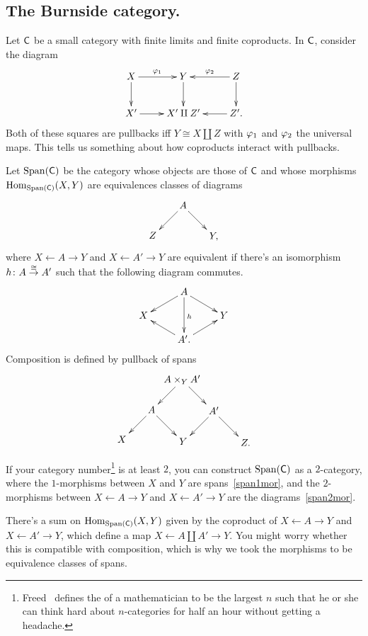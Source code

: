 \subsection*{The Burnside category.}
Let $\mathsf C$ be a small category with finite limits and finite coproducts. In $\mathsf C$, consider the diagram
\[\xymatrix{
	X\ar[r]^{\vp_1}\ar[d] & Y\ar[d] & Z\ar[d]\ar[l]_{\vp_2}\\
	X'\ar[r] & X'\amalg Z' & Z'.\ar[l]
}\]
Both of these squares are pullbacks iff $Y\cong X\amalg Z$ with $\varphi_1$ and $\varphi_2$ the universal maps. This tells
us something about how coproducts interact with pullbacks.
\begin{defn}
Let $\operatorname{Span}(\mathsf C)$ be the category whose objects are those of $\mathsf C$ and whose morphisms $\operatorname{Hom}_{\operatorname{Span}(\mathsf C)}(X,Y)$ are
equivalences classes of diagrams
\begin{equation}
\label{span1mor}
\gathxy[@dr]{
	A\ar[r]\ar[d] & Y,\\
	Z
}
\end{equation}
where $X\gets A\to Y$ and $X\gets A'\to Y$ are equivalent if there's an isomorphism $h\colon A\stackrel\cong\to A'$ such that
the following diagram commutes.
\begin{equation}
\label{span2mor}
\gathxy[@R=0.4cm]{
	& A\ar[dr]\ar[dl]\ar[dd]^h\\
	X && Y\\
	& A'.\ar[ul]\ar[ur]
}
\end{equation}
Composition is defined by pullback of spans
\[\xymatrix@dr{
	A\times_Y A'\ar[r]\ar[d] & A'\ar[r]\ar[d] & Z.\\
	A\ar[r]\ar[d] & Y\\
	X
}\]
\end{defn}
\begin{rem}
If your category number\footnote{Freed~\cite{CSRemarks} defines the  of a mathematician to be
the largest $n$ such that he or she can think hard about $n$-categories for half an hour without getting a
headache.} is at least $2$, you can construct $\operatorname{Span}(\mathsf C)$ as a $2$-category, where the $1$-morphisms between $X$
and $Y$ are spans~\eqref{span1mor}, and the $2$-morphisms between $X\gets A\to Y$ and $X\gets A'\to Y$ are the
diagrams~\eqref{span2mor}.
\end{rem}
There's a sum on $\operatorname{Hom}_{\operatorname{Span}(\mathsf C)}(X,Y)$ given by the coproduct of $X\gets A\to Y$ and $X\gets A'\to Y$, which
define a map $X\gets A\amalg A'\to Y$. You might worry whether this is compatible with composition, which is why
we took the morphisms to be equivalence classes of spans.

